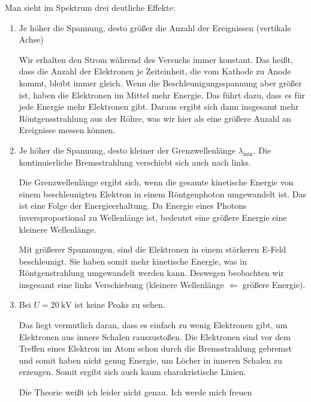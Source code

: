 	Man sieht im Spektrum drei deutliche Effekte:
	\begin{enumerate}
		\item Je höher die Spannung, desto größer die Anzahl der Ereignissen (vertikale Achse)

			Wir erhalten den Strom während des Versuchs immer konstant. Das heißt, dass die Anzahl der Elektronen je Zeiteinheit, die vom Kathode zu Anode kommt, bleibt immer gleich. Wenn die Beschleunigungsspannung aber größer ist, haben die Elektronen im Mittel mehr Energie. Das führt dazu, dass es für jede Energie mehr Elektronen gibt. Daraus ergibt sich dann insgesamt mehr Röntgensstrahlung aus der Röhre, was wir hier als eine größere Anzahl an Ereignisse messen können.

		\item Je höher die Spannung, desto kleiner der Grenzwellenlänge $\lambda_\text{min}$. Die kontinuierliche Bremsstrahlung verschiebt sich auch nach links.

			Die Grenzwellenlänge ergibt sich, wenn die gesamte kinetische Energie von einem beschleunigten Elektron in einem Röntgenphoton umgewandelt ist. Das ist eine Folge der Energieerhaltung. Da Energie eines Photons inversproportional zu Wellenlänge ist, bedeutet eine größere Energie eine kleinere Wellenlänge. 

			Mit größerer Spannungen, sind die Elektronen in einem stärkeren E-Feld beschleunigt. Sie haben somit mehr kinetische Energie, was in Röntgenstrahlung umgewandelt werden kann. Deswegen beobachten wir insgesamt eine links Verschiebung (kleinere Wellenlänge $\Leftarrow$ größere Energie).


		\item Bei $U = \SI{20}{\kilo\volt}$ ist keine Peaks zu sehen.

			Das liegt vermutlich daran, dass es einfach zu wenig Elektronen gibt, um Elektronen aus innere Schalen rauszustoßen. Die Elektronen sind vor dem Treffen eines Elektron im Atom schon durch die Bremsstrahlung gebremst und somit haben nicht genug Energie, um Löcher in inneren Schalen zu erzeugen. Somit ergibt sich auch kaum charakristische Linien.

			Die Theorie weißt ich leider nicht genau. Ich werde mich freuen
	\end{enumerate}
